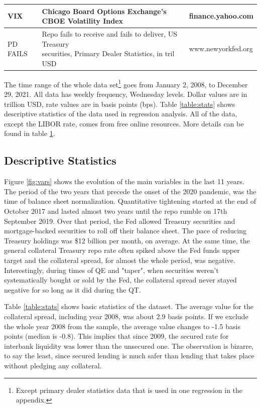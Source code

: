 \documentclass[11pt,a4paper,english,oneside]{article}
\begin{document}
\begin{table}
{\begin{tabular}{lll}
\hline
  VIX & Chicago Board Options Exchange's CBOE Volatility Index & finance.yahoo.com\\
\hline
  PD FAILS & \makecell[l]{Repo fails to receive and fails to deliver, US Treasury\\securities, Primary Dealer Statistics, in tril USD} & www.newyorkfed.org \\
  \bottomrule
\end{tabular}}
\label{table:variables}
\end{table}

The time range of the whole data set\footnote{Except primary dealer statistics data that is used in one regression in the appendix.} goes from January 2, 2008, to December 29, 2021. All data has weekly frequency, Wednesday levels. Dollar values are in trillion USD, rate values are in basis points (bps). Table \ref{table:stats} shows descriptive statistics of the data used in regression analysis. All of the data, except the LIBOR rate, comes from free online resources. More details can be found in table \ref{table:variables}.

\subsection{Descriptive Statistics} \label{sec:stats}

Figure \ref{fig:vars} shows the evolution of the main variables in the last 11 years. The period of the two years that precede the onset of the 2020 pandemic, was the time of balance sheet normalization. Quantitative tightening started at the end of October 2017 and lasted almost two years until the repo rumble on 17th September 2019. Over that period, the Fed allowed Treasury securities and mortgage-backed securities to roll off their balance sheet. The pace of reducing Treasury holdings was \$12 billion per month, on average. At the same time, the general collateral Treasury repo rate often spiked above the Fed funds upper target and the collateral spread, for almost the whole period, was negative. Interestingly, during times of QE and "taper", when securities weren't systematically bought or sold by the Fed, the collateral spread never stayed negative for so long as it did during the QT.

Table \ref{table:stats} shows basic statistics of the dataset. The average value for the collateral spread, including year 2008, was about 2.9 basis points. If we exclude the whole year 2008 from the sample, the average value changes to -1.5 basis points (median is -0.8). This implies that since 2009, the secured rate for interbank liquidity was lower than the unsecured one. The observation is bizarre, to say the least, since secured lending is much safer than lending that takes place without pledging any collateral.
\end{document}
